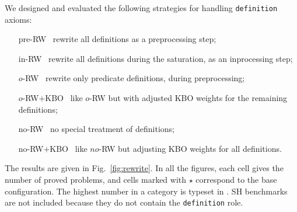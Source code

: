 \documentclass[smallcondensed,draft]{svjour3}     %
\begin{document}


We designed and evaluated the following strategies for handling
\texttt{definition} axioms:

\begin{enumerate}[\rm no-RW$+$KBO~]
  \item[\rm pre-RW~] rewrite all definitions as a preprocessing step;
  \item[\rm in-RW~] rewrite all definitions during the saturation, as an inprocessing step;
  \item[\rm $o$-RW~] rewrite only predicate definitions, during preprocessing;
  \item[\rm $o$-RW$+$KBO~] like $o$-RW but with adjusted KBO weights for the remaining
    definitions;
  \item[\rm no-RW~] no special treatment of definitions;
  \item[\rm no-RW$+$KBO~] like $no$-RW but adjusting KBO weights for all definitions.
\end{enumerate}

The results are given in Fig.~\ref{fig:rewrite}. In all the figures, each
cell gives the number of proved problems, and cells marked with $\star$
correspond to the base configuration. The highest number in a category is typeset in
. SH benchmarks are not
included because they do not contain the \texttt{definition} role.
\end{document}
